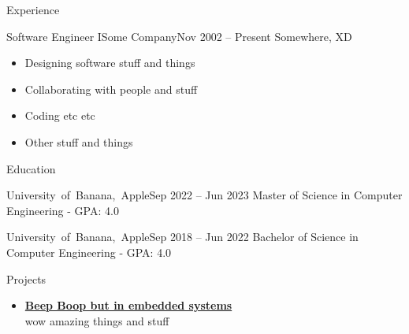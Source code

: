 \documentclass[]{../mcdowellcv}
\begin{document}
\makeheader

\begin{cvsection}{Experience}

    \begin{cvsubsection}{Software Engineer I}{Some Company}{Nov 2002 -- Present}
        Somewhere, XD
        \vspace{2.5mm}
        \begin{itemize}
            \item Designing software stuff and things
            \item Collaborating with people and stuff
            \item Coding etc etc
            \item Other stuff and things
        \end{itemize}
    \end{cvsubsection}
    
\end{cvsection}

\begin{cvsection}{Education}

    \begin{cvsubsection}{\mbox {University of Banana, Apple}}{}{Sep 2022 -- Jun 2023}
        Master of Science in Computer Engineering - GPA: 4.0
    \end{cvsubsection}
    
    \begin{cvsubsection}{\mbox {University of Banana, Apple}}{}{Sep 2018 -- Jun 2022}
        Bachelor of Science in Computer Engineering - GPA: 4.0
    \end{cvsubsection}
     
\end{cvsection}

\begin{cvsection}{Projects}

    \begin{cvsubsection}{}{}{}
        \begin{itemize}
            \setlength\itemsep{3pt}
            \item\textbf{\href{https://github.com/johndoe/beepboop}{Beep Boop but in embedded systems}} \\
            wow amazing things and stuff
        \end{itemize}
    \end{cvsubsection}
    
\end{cvsection}
\end{document}
